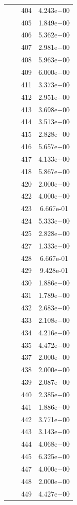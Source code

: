 \documentclass[12pt]{article}
\begin{document}
\begin{longtable}{@{}cccc@{}}
 &  & 404 & 4.243e+00 \\
 &  & 405 & 1.849e+00 \\
 &  & 406 & 5.362e+00 \\
 &  & 407 & 2.981e+00 \\
 &  & 408 & 5.963e+00 \\
 &  & 409 & 6.000e+00 \\
 &  & 411 & 3.373e+00 \\
 &  & 412 & 2.951e+00 \\
 &  & 413 & 3.698e+00 \\
 &  & 414 & 3.513e+00 \\
 &  & 415 & 2.828e+00 \\
 &  & 416 & 5.657e+00 \\
 &  & 417 & 4.133e+00 \\
 &  & 418 & 5.867e+00 \\
 &  & 420 & 2.000e+00 \\
 &  & 422 & 4.000e+00 \\
 &  & 423 & 6.667e-01 \\
 &  & 424 & 5.333e+00 \\
 &  & 425 & 2.828e+00 \\
 &  & 427 & 1.333e+00 \\
 &  & 428 & 6.667e-01 \\
 &  & 429 & 9.428e-01 \\
 &  & 430 & 1.886e+00 \\
 &  & 431 & 1.789e+00 \\
 &  & 432 & 2.683e+00 \\
 &  & 433 & 2.108e+00 \\
 &  & 434 & 4.216e+00 \\
 &  & 435 & 4.472e+00 \\
 &  & 437 & 2.000e+00 \\
 &  & 438 & 2.000e+00 \\
 &  & 439 & 2.087e+00 \\
 &  & 440 & 2.385e+00 \\
 &  & 441 & 1.886e+00 \\
 &  & 442 & 3.771e+00 \\
 &  & 443 & 3.143e+00 \\
 &  & 444 & 4.068e+00 \\
 &  & 445 & 6.325e+00 \\
 &  & 447 & 4.000e+00 \\
 &  & 448 & 2.000e+00 \\
 &  & 449 & 4.427e+00 \\

\end{longtable}
\end{document}
